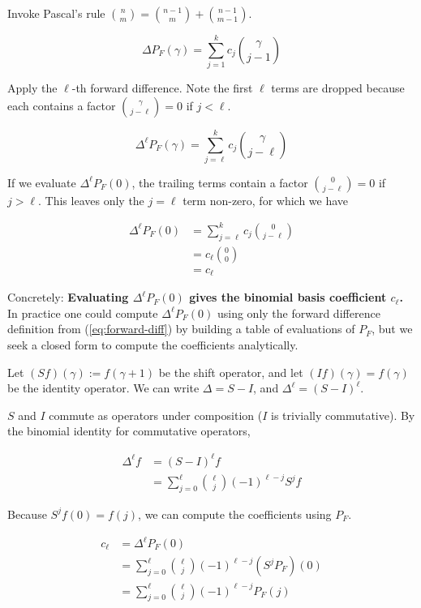 \documentclass[11pt]{article}
\begin{document}
Invoke Pascal's rule $\binom{n}{m} = \binom{n - 1}{m} + \binom{n - 1}{m - 1}$.

\begin{equation}
  \Delta P_F(\gamma) = \sum_{j=1}^k c_j \binom{\gamma}{j - 1}
\end{equation}

Apply the $\ell$-th forward difference. Note the first $\ell$ terms are dropped because each contains a factor $\binom{\gamma}{j - \ell} = 0$ if $j < \ell$.

\begin{equation}
  \Delta^\ell P_F(\gamma) = \sum_{j=\ell}^k c_j \binom{\gamma}{j - \ell}
\end{equation}

If we evaluate $\Delta^\ell P_F(0)$, the trailing terms contain a factor $\binom{0}{j - \ell} = 0$ if $j > \ell$. This leaves only the $j = \ell$ term non-zero, for which we have

\begin{align}
  \Delta^\ell P_F(0)
    &= \sum_{j=\ell}^k c_j \binom{0}{j - \ell} \\
    &= c_\ell \binom{0}{0} \\
    &= c_\ell
\end{align}

Concretely: \textbf{Evaluating $\Delta^\ell P_F(0)$ gives the binomial basis coefficient $c_\ell$.} In practice one could compute $\Delta^\ell P_F(0)$ using only the forward difference definition from (\ref{eq:forward-diff}) by building a table of evaluations of $P_F$, but we seek a closed form to compute the coefficients analytically.

Let $(S f)(\gamma) := f(\gamma + 1)$ be the shift operator, and let $(I f)(\gamma) = f(\gamma)$ be the identity operator. We can write $\Delta = S - I$, and $\Delta^\ell = (S - I)^\ell$.

$S$ and $I$ commute as operators under composition ($I$ is trivially commutative). By the binomial identity for commutative operators,

\begin{align}
  \Delta^\ell f
    &= (S - I)^\ell f \\
    &= \sum_{j = 0}^\ell \binom{\ell}{j} (-1)^{\ell - j} S^j f
\end{align}

Because $S^j f(0) = f(j)$, we can compute the coefficients using $P_F$.

\begin{align}
  c_\ell
    &= \Delta^\ell P_F(0) \\
    &= \sum_{j = 0}^\ell \binom{\ell}{j} (-1)^{\ell - j} (S^j P_F)(0) \\
    &= \sum_{j = 0}^\ell \binom{\ell}{j} (-1)^{\ell - j} P_F(j)
\end{align}
\end{document}
